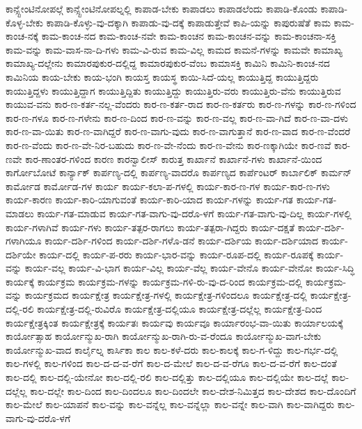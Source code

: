 {ಕಾನ್ಸ್ಟೇಂಟಿನೋಪಲ್ಗೆ
ಕಾನ್ಸ್ಟೇಂಟಿನೋಪಲ್ನಲ್ಲಿ
ಕಾಪಾಡ-ಬೇಕು
ಕಾಪಾಡಲು
ಕಾಪಾಡಲೆಂದು
ಕಾಪಾಡಿ-ಕೊಂಡು
ಕಾಪಾಡಿ-ಕೊಳ್ಳ-ಬೇಕು
ಕಾಪಾಡಿ-ಕೊಳ್ಳು-ವು-ದಕ್ಕಾಗಿ
ಕಾಪಾಡು-ವು-ದಕ್ಕೆ
ಕಾಪಾಡುತ್ತೇವೆ
ಕಾಪಿ-ಯನ್ನು
ಕಾಪುರುಷೆತೆ
ಕಾಮ
ಕಾಮ-ಕಾಂಚ-ನಕ್ಕೆ
ಕಾಮ-ಕಾಂಚ-ನದ
ಕಾಮ-ಕಾಂಚ-ನವೇ
ಕಾಮ-ಕಾಂಚನ
ಕಾಮ-ಕಾಂಚನ-ವನ್ನು
ಕಾಮ-ಕಾಂಚನಾ-ಸಕ್ತಿ
ಕಾಮ-ವನ್ನು
ಕಾಮ-ವಾಸ-ನಾ-ದಿ-ಗಳು
ಕಾಮ-ವಿ-ರುವ
ಕಾಮ-ವಿಲ್ಲ
ಕಾಮದ
ಕಾಮನೆ-ಗಳನ್ನು
ಕಾಮವೇ
ಕಾಮಾಖ್ಯ
ಕಾಮಾಖ್ಯ-ದಲ್ಲೇನು
ಕಾಮಾರಪುಕುರ-ದಲ್ಲಿದ್ದ
ಕಾಮಾರಪುಕುರ-ವೆಂಬ
ಕಾಮಾಸಕ್ತಿ
ಕಾಮಿನಿ
ಕಾಮಿನಿ-ಕಾಂಚ-ನದ
ಕಾಮಿನಿಯ
ಕಾಯ-ಬೇಕು
ಕಾಯ-ಭಂಗಿ
ಕಾಯಸ್ತ
ಕಾಯಸ್ಥ
ಕಾಯಿ-ಸಿದೆ-ಯಲ್ಲ
ಕಾಯುತ್ತಿದ್ದ
ಕಾಯುತ್ತಿದ್ದರು
ಕಾಯುತ್ತಿದ್ದಳು
ಕಾಯುತ್ತಿದ್ದಾಗ
ಕಾಯುತ್ತಿದ್ದಿತು
ಕಾಯುತ್ತಿದ್ದು
ಕಾಯುತ್ತಿರು-ವರು
ಕಾಯುತ್ತಿರು-ವೆನು
ಕಾಯುತ್ತಿರುವ
ಕಾಯುವ-ವನು
ಕಾರ-ಣ-ಕರ್ತ-ನಲ್ಲ-ವೆಂದರು
ಕಾರ-ಣ-ಕರ್ತ-ರಾದ
ಕಾರ-ಣ-ಕರ್ತರು
ಕಾರ-ಣ-ಗಳನ್ನು
ಕಾರ-ಣ-ಗಳಿಂದ
ಕಾರ-ಣ-ಗಳೂ
ಕಾರ-ಣ-ಗಳೇನು
ಕಾರ-ಣ-ದಿಂದ
ಕಾರ-ಣ-ವನ್ನು
ಕಾರ-ಣ-ವಲ್ಲ
ಕಾರ-ಣ-ವಾ-ಗಿದೆ
ಕಾರ-ಣ-ವಾ-ದಳು
ಕಾರ-ಣ-ವಾ-ಯಿತು
ಕಾರ-ಣ-ವಾಗಿದ್ದರೆ
ಕಾರ-ಣ-ವಾಗು-ವುದು
ಕಾರ-ಣ-ವಾಗುತ್ತಾನೆ
ಕಾರ-ಣ-ವಾದ
ಕಾರ-ಣ-ವೆಂದರೆ
ಕಾರ-ಣ-ವೆಂದು
ಕಾರ-ಣ-ವೇ-ನಿರ-ಬಹುದು
ಕಾರ-ಣ-ವೇ-ನೆಂದು
ಕಾರ-ಣ-ವೇನು
ಕಾರ-ಣಕ್ಕಾಗಿಯೇ
ಕಾರ-ಣವೆ
ಕಾರ-ಣವೇ
ಕಾರ-ಣಾಂತರ-ಗಳಿಂದ
ಕಾರಣ
ಕಾರನ್ವಾಲೀಸ್
ಕಾರುತ್ತ
ಕಾರ್ಖಾನೆ
ಕಾರ್ಖಾನೆ-ಗಳು
ಕಾರ್ಖಾನೆ-ಯಿಂದ
ಕಾರ್ಗೋಬೋಟೆ
ಕಾರ್ನ್ಯಾಕ್
ಕಾರ್ಪಣ್ಯ-ದಲ್ಲಿ
ಕಾರ್ಪಣ್ಯ-ವಾದರೊ
ಕಾರ್ಪಣ್ಯದ
ಕಾರ್ಪೆಂಟರ್
ಕಾರ್ಬಾಲಿಕ್
ಕಾರ್ಮನ್
ಕಾರ್ಮೋಡ
ಕಾರ್ಮೋಡ-ಗಳ
ಕಾರ್ಯ
ಕಾರ್ಯ-ಕಲಾ-ಪ-ಗಳಲ್ಲಿ
ಕಾರ್ಯ-ಕಾರ-ಣ-ಗಳ
ಕಾರ್ಯ-ಕಾರ-ಣ-ಗಳು
ಕಾರ್ಯ-ಕಾರಣ
ಕಾರ್ಯ-ಕಾರಿ-ಯಾಗುವಂತೆ
ಕಾರ್ಯ-ಕಾರಿ-ಯಾದ
ಕಾರ್ಯ-ಗಳನ್ನು
ಕಾರ್ಯ-ಗತ
ಕಾರ್ಯ-ಗತ-ಮಾಡಲು
ಕಾರ್ಯ-ಗತ-ಮಾಡುವ
ಕಾರ್ಯ-ಗತ-ವಾಗು-ವು-ದರೊ-ಳಗೆ
ಕಾರ್ಯ-ಗತ-ವಾಗು-ವು-ದಿಲ್ಲ
ಕಾರ್ಯ-ಗಳಲ್ಲಿ
ಕಾರ್ಯ-ಗಳಾಗಿವೆ
ಕಾರ್ಯ-ಗಳು
ಕಾರ್ಯ-ತತ್ಪರ-ರಾಗಲು
ಕಾರ್ಯ-ತತ್ಪರಾ-ಗಿದ್ದರು
ಕಾರ್ಯ-ದಕ್ಷತೆ
ಕಾರ್ಯ-ದರ್ಶಿ-ಗಳಾಗಿಯೂ
ಕಾರ್ಯ-ದರ್ಶಿ-ಗಳಿಂದ
ಕಾರ್ಯ-ದರ್ಶಿ-ಗಳೊ-ಡನೆ
ಕಾರ್ಯ-ದರ್ಶಿಯ
ಕಾರ್ಯ-ದರ್ಶಿಯಾದ
ಕಾರ್ಯ-ದರ್ಶಿಯೇ
ಕಾರ್ಯ-ದಲ್ಲಿ
ಕಾರ್ಯ-ಪ-ರರು
ಕಾರ್ಯ-ಭಾರ-ವನ್ನು
ಕಾರ್ಯ-ರೂಪ-ದಲ್ಲಿ
ಕಾರ್ಯ-ರೂಪಕ್ಕೆ
ಕಾರ್ಯ-ವನ್ನು
ಕಾರ್ಯ-ವಲ್ಲ
ಕಾರ್ಯ-ವಿ-ಭಾಗ
ಕಾರ್ಯ-ವಿಲ್ಲ
ಕಾರ್ಯ-ವೆಲ್ಲ
ಕಾರ್ಯ-ವೇನೊ
ಕಾರ್ಯ-ವೇನೋ
ಕಾರ್ಯ-ಸಿದ್ಧಿ
ಕಾರ್ಯಕ್ಕೆ
ಕಾರ್ಯಕ್ರಮ
ಕಾರ್ಯಕ್ರಮ-ಗಳನ್ನು
ಕಾರ್ಯಕ್ರಮ-ಗಳಿ-ರು-ವು-ದ-ರಿಂದ
ಕಾರ್ಯಕ್ರಮ-ದಲ್ಲಿ
ಕಾರ್ಯಕ್ರಮ-ವನ್ನು
ಕಾರ್ಯಕ್ರಮದ
ಕಾರ್ಯಕ್ಷೇತ್ರ
ಕಾರ್ಯಕ್ಷೇತ್ರ-ಗಳಲ್ಲಿ
ಕಾರ್ಯಕ್ಷೇತ್ರ-ಗಳಿಂದಲೂ
ಕಾರ್ಯಕ್ಷೇತ್ರ-ದಲ್ಲಿ
ಕಾರ್ಯಕ್ಷೇತ್ರ-ದಲ್ಲಿ-ರಲಿ
ಕಾರ್ಯಕ್ಷೇತ್ರ-ದಲ್ಲಿ-ರುವಿರೊ
ಕಾರ್ಯಕ್ಷೇತ್ರ-ದಲ್ಲಿಯೂ
ಕಾರ್ಯಕ್ಷೇತ್ರ-ದಲ್ಲೆಲ್ಲ
ಕಾರ್ಯಕ್ಷೇತ್ರ-ದಿಂದ
ಕಾರ್ಯಕ್ಷೇತ್ರಕ್ಕಿಂತ
ಕಾರ್ಯಕ್ಷೇತ್ರಕ್ಕೆ
ಕಾರ್ಯತಃ
ಕಾರ್ಯವು
ಕಾರ್ಯವೂ
ಕಾರ್ಯಾರಂಭ-ವಾ-ಯಿತು
ಕಾರ್ಯಾಲಯಕ್ಕೆ
ಕಾರ್ಯೋತ್ಸಾಹ
ಕಾರ್ಯೋನ್ಮುಖ-ರಾಗಿ
ಕಾರ್ಯೋನ್ಮುಖ-ರಾಗಿ-ರು-ವ-ರೆಂದೂ
ಕಾರ್ಯೋನ್ಮುಖ-ವಾಗ-ಬೇಕು
ಕಾರ್ಯೋನ್ಮುಖ-ವಾದ
ಕಾರ್ಲೈಲ್ನ
ಕಾರ್ಸಿಕಾ
ಕಾಲ
ಕಾಲ-ಕಳೆ-ದರು
ಕಾಲ-ಕಾಲಕ್ಕೆ
ಕಾಲ-ಗ-ಳಿದ್ದು
ಕಾಲ-ಗರ್ಭ-ದಲ್ಲಿ
ಕಾಲ-ಗಳಲ್ಲಿ
ಕಾಲ-ಗಳಿಂದ
ಕಾಲ-ದ-ದ-ವ-ರೆಗೆ
ಕಾಲ-ದ-ಮೇಲೆ
ಕಾಲ-ದ-ವ-ರೆಗೂ
ಕಾಲ-ದ-ವ-ರೆಗೆ
ಕಾಲ-ದಂತೆ
ಕಾಲ-ದಲ್ಲಿ
ಕಾಲ-ದಲ್ಲಿ-ಯೇನೋ
ಕಾಲ-ದಲ್ಲಿ-ರಲಿ
ಕಾಲ-ದಲ್ಲಿತ್ತು
ಕಾಲ-ದಲ್ಲಿಯೂ
ಕಾಲ-ದಲ್ಲಿಯೇ
ಕಾಲ-ದಲ್ಲೆ
ಕಾಲ-ದಲ್ಲೆಲ್ಲ
ಕಾಲ-ದಲ್ಲೇ
ಕಾಲ-ದಿಂದ
ಕಾಲ-ದಿಂದಲೂ
ಕಾಲ-ದಿಂದಲೇ
ಕಾಲ-ದೇಶ-ನಿಮಿತ್ತದ
ಕಾಲ-ದೇಶದ
ಕಾಲ-ದೊಂದಿಗೆ
ಕಾಲ-ಮೇಲೆ
ಕಾಲ-ಯಾಪನೆ
ಕಾಲ-ವನ್ನು
ಕಾಲ-ವನ್ನೆಲ್ಲ
ಕಾಲ-ವನ್ನೆಲ್ಲಾ
ಕಾಲ-ವನ್ನೇ
ಕಾಲ-ವಾಗಿ
ಕಾಲ-ವಾಗಿದ್ದರು
ಕಾಲ-ವಾಗು-ವು-ದರೊ-ಳಗೆ
}
